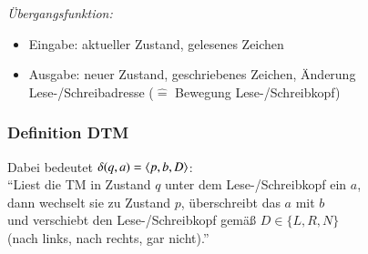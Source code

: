\documentclass[aspectratio=1610,onlymath]{beamer}
\begin{document}
\begin{frame}
\emph{Übergangsfunktion:}
\begin{itemize}
\item \alert{Eingabe:} aktueller Zustand, gelesenes Zeichen
\item \alert{Ausgabe:} neuer Zustand, geschriebenes Zeichen, Änderung Lese-/Schreibadresse (${}\hat{=}{}$ Bewegung Lese-/Schreibkopf)
\end{itemize}

\end{frame}

\begin{frame}\frametitle{Definition DTM}


\alert{Dabei bedeutet $\delta(q,a)=\langle{p,b,D}\rangle$:}\\
\hspace{5mm}"`Liest die TM in Zustand $q$ unter dem Lese-/Schreibkopf ein $a$,\\
\hspace{5.8mm}dann wechselt sie zu Zustand $p$, überschreibt das $a$ mit $b$\\
\hspace{5.8mm}und verschiebt den Lese-/Schreibkopf gemäß $D\in\{L,R,N\}$\\
\hspace{5.8mm}(nach links, nach rechts, gar nicht)."'

\end{frame}
\end{document}
